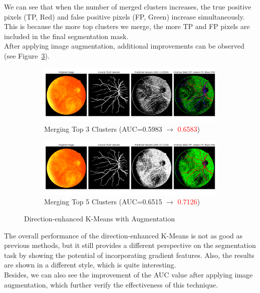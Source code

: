 \documentclass[12pt,letterpaper]{article}
\begin{document}
\noindent
We can see that when the number of merged clusters increases, the true positive pixels (TP, Red) and false positive pixels (FP, Green) increase simultaneously. This is because the more top clusters we merge, the more TP and FP pixels are included in the final segmentation mask. \\ 
After applying image augmentation, additional improvements can be observed (see Figure~\ref{fig:de_aug}).
\begin{figure}[H]
    \centering
    \begin{subfigure}[H]{\textwidth}
        \centering
        \includegraphics[scale=0.35]{Figures/6 Directed (Merge 3 Clusters).png}
        \vspace{-0.5cm}
        \caption{Merging Top 3 Clusters (AUC=0.5983 $\rightarrow$ \textcolor{red}{0.6583})}
        \label{fig:de_aug3}
    \end{subfigure}
    \begin{subfigure}[H]{\textwidth}
        \centering
        \includegraphics[scale=0.35]{Figures/6 Directed (Merge 5 Clusters).png}
        \vspace{-0.5cm}
        \caption{Merging Top 5 Clusters (AUC=0.6515 $\rightarrow$ \textcolor{red}{0.7126})}
        \label{fig:de_aug5}
    \end{subfigure}
    \caption{Direction-enhanced K-Means with Augmentation}
    \label{fig:de_aug}
\end{figure}
\noindent
The overall performance of the direction-enhanced K-Means is not as good as previous methods, but it still provides a different perspective on the segmentation task by showing the potential of incorporating gradient features. Also, the results are shown in a different style, which is quite interesting. \\
Besides, we can also see the improvement of the AUC value after applying image augmentation, which further verify the effectiveness of this technique. 
\end{document}
